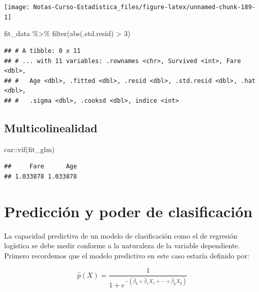 \documentclass[
  12pt,
]{book}
\newenvironment{Shaded}{\begin{snugshade}}{\end{snugshade}}
\newcommand{\DecValTok}[1]{\textcolor[rgb]{0.00,0.00,0.81}{#1}}
\newcommand{\FunctionTok}[1]{\textcolor[rgb]{0.00,0.00,0.00}{#1}}
\newcommand{\NormalTok}[1]{#1}
\newcommand{\SpecialCharTok}[1]{\textcolor[rgb]{0.00,0.00,0.00}{#1}}
\begin{document}
\begin{center}\texttt{[image: Notas-Curso-Estadistica\_files/figure-latex/unnamed-chunk-189-1]} \end{center}

\begin{Shaded}
\begin{Highlighting}[]
\NormalTok{fit\_data }\SpecialCharTok{\%\textgreater{}\%}
    \FunctionTok{filter}\NormalTok{(}\FunctionTok{abs}\NormalTok{(.std.resid) }\SpecialCharTok{\textgreater{}} \DecValTok{3}\NormalTok{)}
\end{Highlighting}
\end{Shaded}

\begin{verbatim}
## # A tibble: 0 x 11
## # ... with 11 variables: .rownames <chr>, Survived <int>, Fare <dbl>,
## #   Age <dbl>, .fitted <dbl>, .resid <dbl>, .std.resid <dbl>, .hat <dbl>,
## #   .sigma <dbl>, .cooksd <dbl>, indice <int>
\end{verbatim}

\hypertarget{multicolinealidad-1}{%
\subsection{Multicolinealidad}\label{multicolinealidad-1}}

\begin{Shaded}
\begin{Highlighting}[]
\NormalTok{car}\SpecialCharTok{::}\FunctionTok{vif}\NormalTok{(fit\_glm)}
\end{Highlighting}
\end{Shaded}

\begin{verbatim}
##     Fare      Age 
## 1.033878 1.033878
\end{verbatim}

\hypertarget{predicciuxf3n-y-poder-de-clasificaciuxf3n}{%
\section{Predicción y poder de
clasificación}\label{predicciuxf3n-y-poder-de-clasificaciuxf3n}}

La capacidad predictiva de un modelo de clasificación como el de
regresión logística se debe medir conforme a la naturaleza de la
variable dependiente. Primero recordemos que el modelo predictivo en
este caso estaría definido por:

\begin{equation*}
\hat{p}(X)=\frac{1}{1+e^{-(\hat{\beta}_{0}+\hat{\beta}_{1} X_{1}+\cdots+\hat{\beta}_{p} X_{p})}}
\end{equation*}
\end{document}
